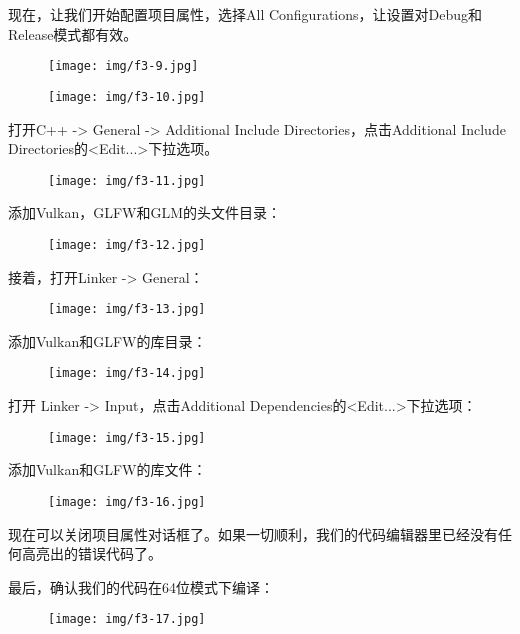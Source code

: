 \documentclass{ctexart}
\begin{document}
现在，让我们开始配置项目属性，选择All Configurations，让设置对Debug和Release模式都有效。

\begin{figure}[H]
	\centering
	\texttt{[image: img/f3-9.jpg]}
\end{figure}

\begin{figure}[H]
	\centering
	\texttt{[image: img/f3-10.jpg]}
\end{figure}

打开C++ -> General -> Additional Include Directories，点击Additional Include Directories的<Edit...>下拉选项。

\begin{figure}[H]
	\centering
	\texttt{[image: img/f3-11.jpg]}
\end{figure}

添加Vulkan，GLFW和GLM的头文件目录：

\begin{figure}[H]
	\centering
	\texttt{[image: img/f3-12.jpg]}
\end{figure}

接着，打开Linker -> General：

\begin{figure}[H]
	\centering
	\texttt{[image: img/f3-13.jpg]}
\end{figure}

添加Vulkan和GLFW的库目录：

\begin{figure}[H]
	\centering
	\texttt{[image: img/f3-14.jpg]}
\end{figure}

打开 Linker -> Input，点击Additional Dependencies的<Edit...>下拉选项：

\begin{figure}[H]
	\centering
	\texttt{[image: img/f3-15.jpg]}
\end{figure}

添加Vulkan和GLFW的库文件：

\begin{figure}[H]
	\centering
	\texttt{[image: img/f3-16.jpg]}
\end{figure}

现在可以关闭项目属性对话框了。如果一切顺利，我们的代码编辑器里已经没有任何高亮出的错误代码了。

最后，确认我们的代码在64位模式下编译：

\begin{figure}[H]
	\centering
	\texttt{[image: img/f3-17.jpg]}
\end{figure}
\end{document}

